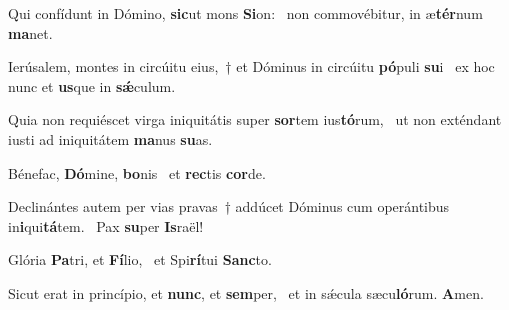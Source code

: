 \item Qui confídunt in Dómino, \textbf{sic}ut mons \textbf{Si}on:~\psstar{} non commovébitur, in æ\textbf{tér}num \textbf{ma}net.

\item Ierúsalem, montes in circúitu eius,~† et Dóminus in circúitu \textbf{pó}puli \textbf{su}i~\psstar{} ex hoc nunc et \textbf{us}que in \textbf{sǽ}culum.

\item Quia non requiéscet virga iniquitátis super \textbf{sor}tem ius\textbf{tó}rum,~\psstar{} ut non exténdant iusti ad iniquitátem \textbf{ma}nus \textbf{su}as.

\item Bénefac, \textbf{Dó}mine, \textbf{bo}nis~\psstar{} et \textbf{rec}tis \textbf{cor}de.

\item Declinántes autem per vias pravas~† addúcet Dóminus cum operántibus in\textbf{i}qui\textbf{tá}tem.~\psstar{} Pax \textbf{su}per \textbf{Is}raël!

\item Glória \textbf{Pa}tri, et \textbf{Fí}lio,~\psstar{} et Spi\textbf{rí}tui \textbf{Sanc}to.

\item Sicut erat in princípio, et \textbf{nunc}, et \textbf{sem}per,~\psstar{} et in sǽcula sæcu\textbf{ló}rum. \textbf{A}men.